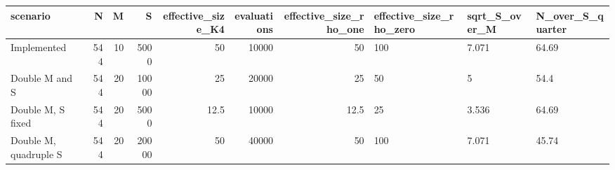 \begin{tabular}{lrrrrrr}
\toprule
scenario & N & M & S & effective_size_K4 & evaluations & effective_size_rho_one & effective_size_rho_zero & sqrt_S_over_M & N_over_S_quarter \\
\midrule
Implemented & 544 & 10 & 5000 & 50 & 10000 & 50 & 100 & 7.071 & 64.69 \\
Double M and S & 544 & 20 & 10000 & 25 & 20000 & 25 & 50 & 5 & 54.4 \\
Double M, S fixed & 544 & 20 & 5000 & 12.5 & 10000 & 12.5 & 25 & 3.536 & 64.69 \\
Double M, quadruple S & 544 & 20 & 20000 & 50 & 40000 & 50 & 100 & 7.071 & 45.74 \\
\bottomrule
\end{tabular}
